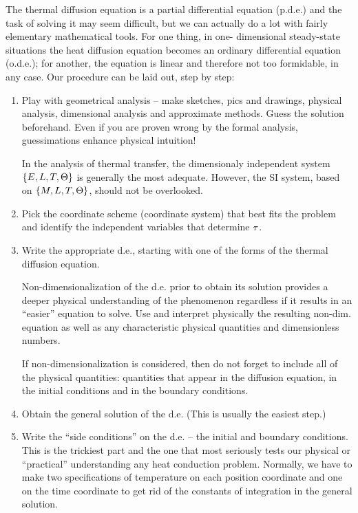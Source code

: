 The thermal diffusion equation is a partial differential equation (p.d.e.) and the task of solving it may seem difficult, but we can actually do a lot with fairly elementary mathematical tools. For one thing, in one- dimensional steady-state situations the heat diffusion equation becomes an ordinary differential equation (o.d.e.); for another, the equation is linear and therefore not too formidable, in any case. Our procedure can be laid out, step by step:
\begin{enumerate}
%
\item Play with geometrical analysis -- make sketches, pics and drawings, physical analysis, dimensional analysis and approximate methods. Guess the solution beforehand. Even if you are proven wrong by the formal analysis, guessimations enhance physical intuition!

\begin{note}
In the analysis of thermal transfer, the dimensionaly independent system $\left\lbrace{E, L, T, \Theta}\right\rbrace$ is generally the most adequate. However, the SI system, based on $\left\lbrace{M,L,T,\Theta}\right\rbrace$, should not be overlooked.
\end{note}
%
\item Pick the coordinate scheme (coordinate system) that best fits the problem and identify the independent variables that determine $\tau$.
%
\item Write the appropriate d.e., starting with one of the forms of the thermal diffusion equation.

\begin{note}
Non-dimensionalization of the d.e. prior to obtain its solution provides a deeper physical understanding of the phenomenon regardless if it results in an ``easier'' equation to solve. Use and interpret physically the resulting non-dim. equation as well as any characteristic physical quantities and dimensionless numbers.
\end{note}

\begin{remark}
If non-dimensionalization is considered, then do not forget to include all of the physical quantities: quantities that appear in the diffusion equation, in the initial conditions and in the boundary conditions.
\end{remark}
%
\item Obtain the general solution of the d.e. (This is usually the easiest step.)
%
\item Write the ``side conditions'' on the d.e. -- the initial and boundary conditions. This is the trickiest part and the one that most seriously tests our physical or ``practical'' understanding any heat conduction problem.
Normally, we have to make two specifications of temperature on each position coordinate and one on the time coordinate to get rid of the constants of integration in the general solution.


\end{enumerate}
